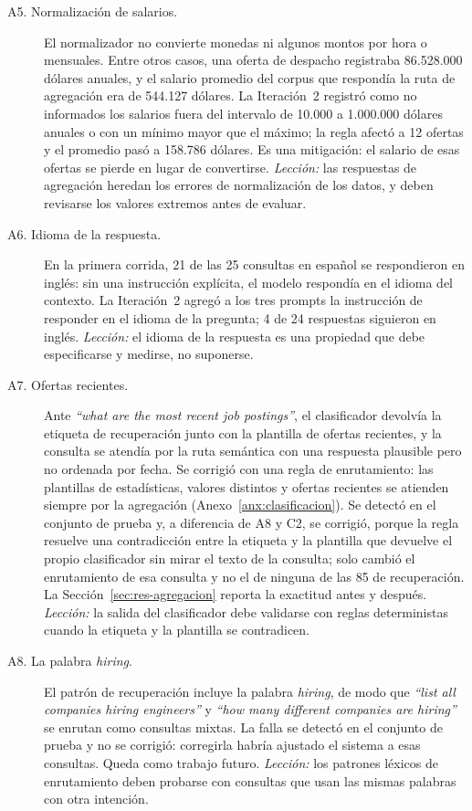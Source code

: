 \begin{description}
    \item[A5. Normalización de salarios.] El normalizador no convierte monedas ni algunos montos por hora o mensuales. Entre otros casos, una oferta de despacho registraba 86.528.000 dólares anuales, y el salario promedio del corpus que respondía la ruta de agregación era de 544.127 dólares. La Iteración~2 registró como no informados los salarios fuera del intervalo de 10.000 a 1.000.000 dólares anuales o con un mínimo mayor que el máximo; la regla afectó a 12 ofertas y el promedio pasó a 158.786 dólares. Es una mitigación: el salario de esas ofertas se pierde en lugar de convertirse. \emph{Lección:} las respuestas de agregación heredan los errores de normalización de los datos, y deben revisarse los valores extremos antes de evaluar.
    \item[A6. Idioma de la respuesta.] En la primera corrida, 21 de las 25 consultas en español se respondieron en inglés: sin una instrucción explícita, el modelo respondía en el idioma del contexto. La Iteración~2 agregó a los tres prompts la instrucción de responder en el idioma de la pregunta; 4 de 24 respuestas siguieron en inglés. \emph{Lección:} el idioma de la respuesta es una propiedad que debe especificarse y medirse, no suponerse.
    \item[A7. Ofertas recientes.] Ante \textit{\enquote{what are the most recent job postings}}, el clasificador devolvía la etiqueta de recuperación junto con la plantilla de ofertas recientes, y la consulta se atendía por la ruta semántica con una respuesta plausible pero no ordenada por fecha. Se corrigió con una regla de enrutamiento: las plantillas de estadísticas, valores distintos y ofertas recientes se atienden siempre por la agregación (Anexo~\ref{anx:clasificacion}). Se detectó en el conjunto de prueba y, a diferencia de A8 y C2, se corrigió, porque la regla resuelve una contradicción entre la etiqueta y la plantilla que devuelve el propio clasificador sin mirar el texto de la consulta; solo cambió el enrutamiento de esa consulta y no el de ninguna de las 85 de recuperación. La Sección~\ref{sec:res-agregacion} reporta la exactitud antes y después. \emph{Lección:} la salida del clasificador debe validarse con reglas deterministas cuando la etiqueta y la plantilla se contradicen.
    \item[A8. La palabra \textit{hiring}.] El patrón de recuperación incluye la palabra \textit{hiring}, de modo que \textit{\enquote{list all companies hiring engineers}} y \textit{\enquote{how many different companies are hiring}} se enrutan como consultas mixtas. La falla se detectó en el conjunto de prueba y no se corrigió: corregirla habría ajustado el sistema a esas consultas. Queda como trabajo futuro. \emph{Lección:} los patrones léxicos de enrutamiento deben probarse con consultas que usan las mismas palabras con otra intención.
\end{description}


